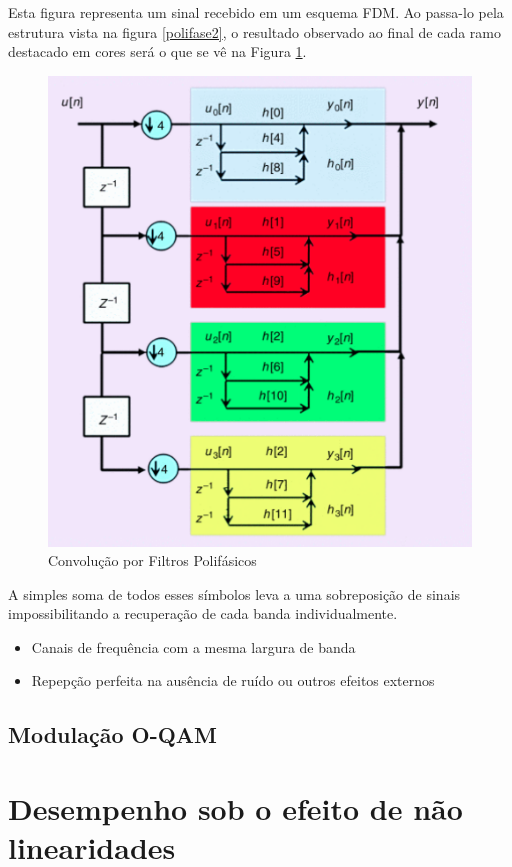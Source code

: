 Esta figura representa um sinal recebido em um esquema FDM. Ao passa-lo pela estrutura vista na figura \ref{polifase2}, o resultado observado ao final de cada ramo destacado em cores será o que se vê  na Figura \ref{polifase4}. 

\begin{figure}[h!]
\centering
\includegraphics[width=4.5in]{filtro_down.png}
\caption{Convolução por Filtros Polifásicos \cite{Krishna}}
\label{polifase4}
\end{figure} 

A simples soma de todos esses símbolos leva a uma sobreposição de sinais impossibilitando a recuperação de cada banda individualmente. 

\begin{itemize}
\item Canais de frequência com a mesma largura de banda
\item Repepção perfeita na ausência de ruído ou outros efeitos externos 
\end{itemize}


\subsection{Modulação O-QAM} 



\section{Desempenho sob o efeito de não linearidades }